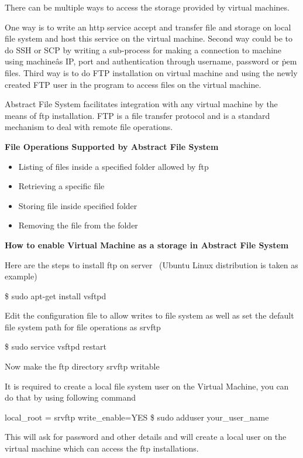 There can be multiple ways to access the storage provided by virtual machines. 

One way is to write an http service accept and transfer file and storage on 
local file system and host this service on the virtual machine. Second way 
could be to do SSH or SCP by writing a sub-process for making a connection to 
machine using machineâs IP, port and authentication through username, 
password or \.pem files. Third way is to do FTP installation on virtual 
machine and using the newly created FTP user in the program to access files on 
the virtual machine.


Abstract File System facilitates integration with any virtual machine by the 
means of ftp installation. FTP is a file transfer protocol and is a standard 
mechanism to deal with remote file operations.


\textbf{File Operations Supported by Abstract File System }
\begin{itemize}
    \item  Listing of files inside a specified folder allowed by ftp
    \item  Retrieving a specific file 
    \item  Storing file inside specified folder
    \item  Removing the file from the folder
\end{itemize}   

\textbf{How to enable Virtual Machine as a storage in Abstract File System}

Here are the steps to install ftp on server~\cite{hid-sp18-420-FTP}
(Ubuntu Linux distribution is taken as example)


\$ sudo apt-get install vsftpd


Edit the configuration file to allow writes to file system as well as set the 
default file system path for file operations as \/srv\/ftp


\$ sudo service vsftpd restart


Now make the ftp directory \/srv\/ftp writable 


It is required to create a local file system user on the Virtual Machine, you 
can do that by using following command

	
local\_root = \/srv\/ftp  
write\_enable=YES       
\$ sudo adduser your\_user\_name    


This will ask for password and other details and will create a local user on 
the virtual machine which can access the ftp installations.

